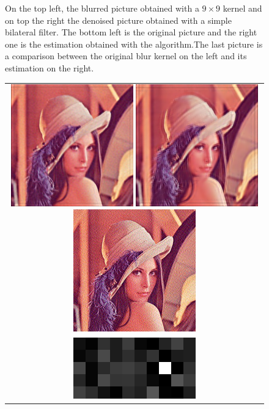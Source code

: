 \documentclass{article}
\begin{document}
\begin{figure}
\begin{center}
\begin{tabular}{c}
	\end{tabular}
	\caption{On the top left, the blurred picture obtained with a $9\times9$ kernel and on top the right the denoised picture obtained with a simple bilateral filter. The bottom left is the original picture and the right one is the estimation obtained with the algorithm.The last picture is a comparison between the original blur kernel on the left and its estimation on the right.}
	\label{lena_9px}
\end{center}
\end{figure}

\begin{figure}
\begin{center}
	\begin{tabular}{c}	
		\includegraphics[scale=1]{images/estimation_5px.png}
		\includegraphics[scale=1]{images/estimation_0.png}
		\includegraphics[scale=1]{images/estimation_N.png}\\
		\includegraphics[scale=1]{images/kernels_5px.png}

\end{tabular}
\end{center}
\end{figure}
\end{document}
